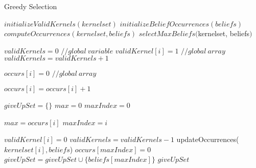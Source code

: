\begin{algorithm}
\caption{Greedy Selection}
\label{GreedyAlgorithm}
\begin{algorithmic}[1]
\State $initializeValidKernels(kernelset)$
\State $initializeBeliefOccurrences(beliefs)$
\State $computeOccurrences(kernelset, beliefs)$
\State \Return $selectMaxBeliefs($kernelset, beliefs$)$
\EndFunction
\end{algorithmic}
\end{algorithm}

\begin{algorithm}
\begin{algorithmic}[1]
\State $validKernels = 0$ $// global \: variable$
\State $validKernel[i] = 1$  $// global \: array$
\State $validKernels = validKernels + 1$
\EndFor
\EndFunction
\end{algorithmic}

\begin{algorithmic}[1]
\State $occurs[i] = 0$  $// global \: array$
\EndFor
\EndFunction
\end{algorithmic}

\begin{algorithmic}[1]
\State $occurs[i] = occurs[i] + 1$
\EndIf
\EndFor
\EndFor
\EndFunction
\end{algorithmic}

\begin{algorithmic}[1]
\State $giveUpSet = \lbrace \rbrace$
\State $max = 0$
\State $maxIndex = 0$

\State $max = occurs[i]$
\State $maxIndex = i$
\EndIf
\EndFor

\State $validKernel[i] = 0$
\State $validKernels = validKernels - 1$
\State updateOccurrences($kernelset[i], beliefs$)
\EndIf
\EndFor
\State $occurs[maxIndex] = 0$
\State $giveUpSet = giveUpSet \cup \lbrace beliefs[maxIndex] \rbrace$
\EndWhile
\State \Return $giveUpSet$
\EndFunction
\end{algorithmic}
\end{algorithm}

